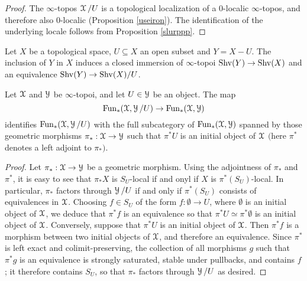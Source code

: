 \begin{proof}
The $\infty$-topos $\operatorname{\mathcal{X}}/U$ is a topological localization of a $0$-localic $\infty$-topos, and therefore also $0$-localic (Proposition \ref{useiron}). The identification of the underlying locale follows from Proposition \ref{slurppp}.
\end{proof}

\begin{corollary}\label{closeduse1}
Let $X$ be a topological space, $U \subseteq X$ an open subset and $Y = X - U$. The inclusion
of $Y$ in $X$ induces a closed immersion of $\infty$-topoi $\operatorname{Shv}(Y) \rightarrow \operatorname{Shv}(X)$ and
an equivalence $\operatorname{Shv}(Y) \rightarrow \operatorname{Shv}(X)/U$.
\end{corollary}

\begin{lemma}\label{unipropclose}
Let $\operatorname{\mathcal{X}}$ and $\operatorname{\mathcal{Y}}$ be $\infty$-topoi, and let $U \in \operatorname{\mathcal{Y}}$ be an object. The map
$$ \operatorname{Fun}_{\ast}(\operatorname{\mathcal{X}}, \operatorname{\mathcal{Y}}/U) \rightarrow \operatorname{Fun}_{\ast}(\operatorname{\mathcal{X}}, \operatorname{\mathcal{Y}})$$ identifies
$\operatorname{Fun}_{\ast}(\operatorname{\mathcal{X}}, \operatorname{\mathcal{Y}}/U)$ with the full subcategory of $\operatorname{Fun}_{\ast}(\operatorname{\mathcal{X}},\operatorname{\mathcal{Y}})$ spanned by those geometric morphisms $\pi_{\ast}: \operatorname{\mathcal{X}} \rightarrow \operatorname{\mathcal{Y}}$ such that $\pi^{\ast} U$ is an initial object of $\operatorname{\mathcal{X}}$ $($here $\pi^{\ast}$ denotes a left adjoint to $\pi_{\ast}${}$)$.
\end{lemma}

\begin{proof}
Let $\pi_{\ast}: \operatorname{\mathcal{X}} \rightarrow \operatorname{\mathcal{Y}}$ be a geometric morphism. Using the adjointness of
$\pi_{\ast}$ and $\pi^{\ast}$, it is easy to see that $\pi_{\ast} X$ is $S_U$-local if and onyl if
$X$ is $\pi^{\ast}(S_U)$-local. In particular, $\pi_{\ast}$ factors through $\operatorname{\mathcal{Y}}/U$ if and only if
$\pi^{\ast}(S_U)$ consists of equivalences in $\operatorname{\mathcal{X}}$. 
Choosing $f \in S_{U}$ of the form $f: \emptyset \rightarrow U$, where
$\emptyset$ is an initial object of $\operatorname{\mathcal{X}}$, we deduce that $\pi^{\ast} f$ is an equivalence
so that $\pi^{\ast} U \simeq \pi^{\ast} \emptyset$ is an initial object of $\operatorname{\mathcal{X}}$. 
Conversely, suppose that $\pi^{\ast} U$ is an initial object of $\operatorname{\mathcal{X}}$. Then
$\pi^{\ast} f$ is a morphism between two initial objects of $\operatorname{\mathcal{X}}$, and therefore an equivalence.
Since $\pi^{\ast}$ is left exact and colimit-preserving, the collection of all morphisms
$g$ such that $\pi^{\ast} g$ is an equivalence is strongly saturated, stable under pullbacks, and contains $f$; it therefore contains $S_{U}$, so that $\pi_{\ast}$ factors through $\operatorname{\mathcal{Y}}/U$ as desired.
\end{proof}

